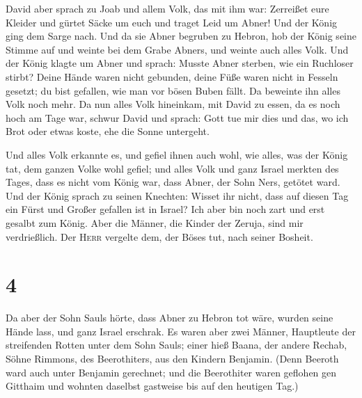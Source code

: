  David aber sprach zu Joab und allem Volk, das mit ihm
war: Zerreißet eure Kleider und gürtet Säcke um euch und traget Leid um
Abner! Und der König ging dem Sarge nach.  Und da sie
Abner begruben zu Hebron, hob der König seine Stimme auf und weinte bei
dem Grabe Abners, und weinte auch alles Volk.  Und der
König klagte um Abner und sprach: Musste Abner sterben, wie ein
Ruchloser stirbt?  Deine Hände waren nicht gebunden,
deine Füße waren nicht in Fesseln gesetzt; du bist gefallen, wie man vor
bösen Buben fällt. Da beweinte ihn alles Volk noch mehr. 
Da nun alles Volk hineinkam, mit David zu essen, da es noch hoch am Tage
war, schwur David und sprach: Gott tue mir dies und das, wo ich Brot
oder etwas koste, ehe die Sonne untergeht.

 Und alles Volk erkannte es, und gefiel ihnen auch wohl,
wie alles, was der König tat, dem ganzen Volke wohl gefiel;
 und alles Volk und ganz Israel merkten des Tages, dass
es nicht vom König war, dass Abner, der Sohn Ners, getötet ward.
 Und der König sprach zu seinen Knechten: Wisset ihr
nicht, dass auf diesen Tag ein Fürst und Großer gefallen ist in Israel?
 Ich aber bin noch zart und erst gesalbt zum König. Aber
die Männer, die Kinder der Zeruja, sind mir verdrießlich. Der
\textsc{Herr} vergelte dem, der Böses tut, nach seiner Bosheit.

\hypertarget{section-3}{%
\section{4}\label{section-3}}

 Da aber der Sohn Sauls hörte, dass Abner zu Hebron tot
wäre, wurden seine Hände lass, und ganz Israel erschrak. 
Es waren aber zwei Männer, Hauptleute der streifenden Rotten unter dem
Sohn Sauls; einer hieß Baana, der andere Rechab, Söhne Rimmons, des
Beerothiters, aus den Kindern Benjamin. (Denn Beeroth ward auch unter
Benjamin gerechnet;  und die Beerothiter waren geflohen
gen Gitthaim und wohnten daselbst gastweise bis auf den heutigen Tag.)

